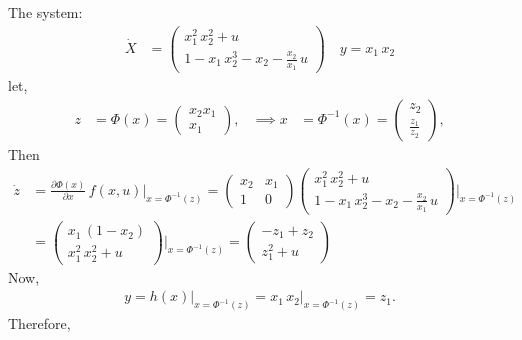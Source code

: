 The system: 
\begin{align*}
    \dot X &= \begin{pmatrix}
        x_1^2\,x_2^2 + u \\ 1 - x_1\,x_2^3 - x_2 - \frac{x_2}{x_1}\,u 
    \end{pmatrix}\quad y = x_1\,x_2 
\end{align*}
let, 
\begin{align*}
    z &= \Phi(x) = \begin{pmatrix}
        x_2x_1 \\ x_1
    \end{pmatrix}, & \implies x &= \Phi^{-1}(x) = \begin{pmatrix}
        z_2 \\ \frac{z_1}{z_2}
    \end{pmatrix}, 
\end{align*}
Then 
\begin{align*}
    \dot z &= \frac{\partial\Phi\left(x\right)}{\partial x}\, f\left(x,u\right)\Bigg|_{x = \Phi^{-1}(z)} = \begin{pmatrix} x_2 & x_1 \\ 1 & 0\end{pmatrix} \begin{pmatrix}
        x_1^2\,x_2^2 + u \\ 1 - x_1\,x_2^3 - x_2 - \frac{x_2}{x_1}\,u 
    \end{pmatrix}\Bigg|_{x = \Phi^{-1}(z)} \\
    &= \begin{pmatrix}
        x_1\,\left(1 - x_2\right) \\ x_1^2\,x_2^2 + u
    \end{pmatrix}\Bigg|_{x = \Phi^{-1}(z)} = \begin{pmatrix}
        -z_1 + z_2 \\ z_1^2 + u
    \end{pmatrix}
\end{align*}   
Now, 
\begin{align*}
    y = h(x)\big|_{x = \Phi^{-1}(z)} = x_1\,x_2\big|_{x = \Phi^{-1}(z)} = z_1.
\end{align*}
Therefore, 
